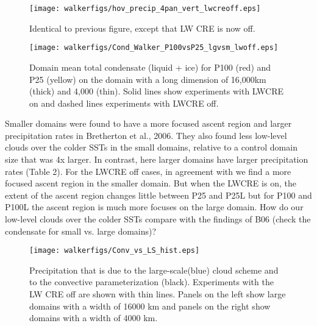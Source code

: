 \documentclass[draft]{agujournal2019}
\begin{document}
\begin{figure}
  \texttt{[image: walkerfigs/hov\_precip\_4pan\_vert\_lwcreoff.eps]}
  \caption{Identical to previous figure, except that LW CRE is now off.}
  \label{fig:domdep_lwoff}
\end{figure}

\begin{figure}
  \centering
       \texttt{[image: walkerfigs/Cond\_Walker\_P100vsP25\_lgvsm\_lwoff.eps]}
          \caption{Domain mean total condensate (liquid + ice) for P100 (red) and P25 (yellow) on the domain 
          with a long dimension of 16,000km (thick) and 4,000 (thin).  Solid lines show experiments with LWCRE on
          and dashed lines experiments with LWCRE off.}
  \label{fig:TotCond}
\end{figure}


Smaller domains were found to have a more focused ascent region and larger precipitation rates in Bretherton et al., 2006.
They also found less low-level clouds over the colder SSTs in the small domains, relative to a control domain size that was 4x
larger.   In contrast, here larger domains have larger precipitation rates (Table 2).  For the LWCRE off cases, in agreement 
with  we find a more 
focused ascent region in the smaller domain.   But when the LWCRE is on, the extent of the ascent region changes little between P25 
and P25L but for P100 and P100L the ascent region is much more focuses on the large domain.    
How do our low-level clouds over the colder SSTs compare with the findings of B06 (check the condensate for small vs. large 
domains)?   

\begin{figure}
  \centering
      \texttt{[image: walkerfigs/Conv\_vs\_LS\_hist.eps]}
  \caption{Precipitation that is due to the large-scale(blue) cloud scheme and to the convective 
  parameterization (black).  Experiments with the LW CRE off are shown with thin lines.  
  Panels on the left show large domains with a width of 16000 km and
  panels on the right show domains with a width of 4000 km.}
  \label{fig:conv_vs_ls}
\end{figure}
\end{document}

